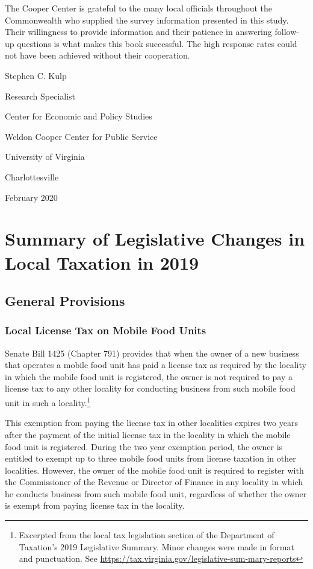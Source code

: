 \documentclass[
]{book}
\begin{document}
The Cooper Center is grateful to the many local officials throughout the Commonwealth who supplied the survey information presented in this study. Their willingness to provide information and their patience in answering follow-up questions is what makes this book successful. The high response rates could not have been achieved without their cooperation.

Stephen C. Kulp

Research Specialist

Center for Economic and Policy Studies

Weldon Cooper Center for Public Service

University of Virginia

Charlottesville

February 2020

\hypertarget{summary-of-legislative-changes-in-local-taxation-in-2019}{%
\chapter{Summary of Legislative Changes in Local Taxation in 2019}\label{summary-of-legislative-changes-in-local-taxation-in-2019}}

\hypertarget{general-provisions}{%
\section{General Provisions}\label{general-provisions}}

\hypertarget{local-license-tax-on-mobile-food-units}{%
\subsection{Local License Tax on Mobile Food Units}\label{local-license-tax-on-mobile-food-units}}

Senate Bill 1425 (Chapter 791) provides that when the owner of a new business that operates a mobile food unit has paid a license tax as required by the locality in which the mobile food unit is registered, the owner is not required to pay a license tax to any other locality for conducting business from such mobile food unit in such a locality.\footnote{Excerpted from the local tax legislation section of the Department of Taxation's 2019 Legislative Summary. Minor changes were made in format and punctuation. See \url{https://tax.virginia.gov/legislative-sum-mary-reports}}

This exemption from paying the license tax in other localities expires two years after the payment of the initial license tax in the locality in which the mobile food unit is registered. During the two year exemption period, the owner is entitled to exempt up to three mobile food units from license taxation in other localities. However, the owner of the mobile food unit is required to register with the Commissioner of the Revenue or Director of Finance in any locality in which he conducts business from such mobile food unit, regardless of whether the owner is exempt from paying license tax in the locality.
\end{document}
